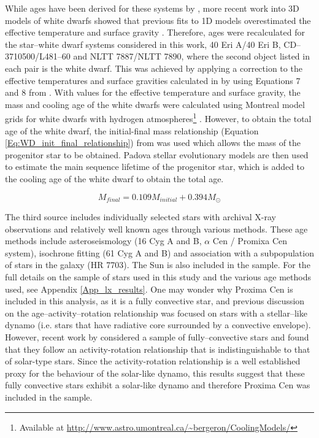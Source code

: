 While ages have been derived for these systems by \citet{Garces_etal_2011}, more recent work into 3D models of white dwarfs showed that previous fits to 1D models overestimated the effective temperature and surface gravity \citep{Tremblay_etal_2013}. Therefore, ages were recalculated for the star--white dwarf systems considered in this work, 40 Eri A/40 Eri B, CD--3710500/L481--60 and NLTT 7887/NLTT 7890, where the second object listed in each pair is the white dwarf. This was achieved by applying a correction to the effective temperatures and surface gravities calculated in \citet{Garces_etal_2011} by using Equations 7 and 8 from \citet{Tremblay_etal_2013}. With values for the effective temperature and surface gravity, the mass and cooling age of the white dwarfs were calculated using Montreal model grids for white dwarfs with hydrogen atmospheres\footnote{Available at \url{http://www.astro.umontreal.ca/~bergeron/CoolingModels/}} \citep{Holberg_Bergeron_2006,Kowalski_Saumon_2006,Bergeron_etal_2011,Tremblay_etal_2011}. However, to obtain the total age of the white dwarf, the initial-final mass relationship (Equation \ref{Eq:WD_init_final_relationship}) from \citet{Kalirai_etal_2008} was used which allows the mass of the progenitor star to be obtained. Padova stellar evolutionary models \citep{Bertelli_etal_2008} are then used to estimate the main sequence lifetime of the progenitor star, which is added to the cooling age of the white dwarf to obtain the total age.

\begin{equation}
    M_{final} = 0.109M_{initial} + 0.394M_{\odot}
    \label{Eq:WD_init_final_relationship}
\end{equation}

The third source includes individually selected stars with archival X-ray observations and relatively well known ages through various methods. These age methods include asteroseismology (16 Cyg A and B, $\alpha$ Cen / Promixa Cen system), isochrone fitting (61 Cyg A and B) and association with a subpopulation of stars in the galaxy (HR 7703). The Sun is also included in the sample. For the full details on the sample of stars used in this study and the various age methods used, see Appendix \ref{App_lx_results}. One may wonder why Proxima Cen is included in this analysis, as it is a fully convective star, and previous discussion on the age--activity--rotation relationship was focused on stars with a stellar--like dynamo (i.e. stars that have radiative core surrounded by a convective envelope). However, recent work by \citet{Wright_Drake_2016} considered a sample of fully--convective stars and found that they follow an activity-rotation relationship that is indistinguishable to that of solar-type stars. Since the activity-rotation relationship is a well established proxy for the behaviour of the solar-like dynamo, this results suggest that these fully convective stars exhibit a solar-like dynamo and therefore Proxima Cen was included in the sample.

